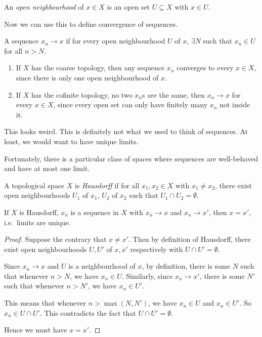 \documentclass[a4paper]{article}
\begin{document}
\begin{defi}
  An \emph{open neighbourhood} of $x\in X$ is an open set $U\subseteq X$ with $x\in U$.
\end{defi}

Now we can use this to define convergence of sequences.
\begin{defi}
  A sequence $x_n \to x$ if for every open neighbourhood $U$ of $x$, $\exists N$ such that $x_n \in U$ for all $n > N$.
\end{defi}

\begin{eg}\leavevmode
  \begin{enumerate}
    \item If $X$ has the coarse topology, then any sequence $x_n$ converges to every $x\in X$, since there is only one open neighbourhood of $x$.
    \item If $X$ has the cofinite topology, no two $x_n$s are the same, then $x_n \to x$ for every $x\in X$, since every open set can only have finitely many $x_n$ not inside it.
  \end{enumerate}
\end{eg}

This looks weird. This is definitely not what we used to think of sequences. At least, we would want to have unique limits.

Fortunately, there is a particular class of spaces where sequences are well-behaved and have at most one limit.
\begin{defi}
  A topological space $X$ is \emph{Hausdorff} if for all $x_1, x_2\in X$ with $x_1 \not= x_2$, there exist open neighbourhoods $U_1$ of $x_1$, $U_2$ of $x_2$ such that $U_1 \cap U_2 = \emptyset$.
\end{defi}

\begin{lemma}
  If $X$ is Hausdorff, $x_n$ is a sequence in $X$ with $x_n \to x$ and $x_n \to x'$, then $x = x'$, i.e.\ limits are unique.
\end{lemma}

\begin{proof}
  Suppose the contrary that $x\not= x'$. Then by definition of Hausdorff, there exist open neighbourhoods $U, U'$ of $x, x'$ respectively with $U \cap U' = \emptyset$.

  Since $x_n \to x$ and $U$ is a neighbourhood of $x$, by definition, there is some $N$ such that whenever $n > N$, we have $x_n \in U$. Similarly, since $x_n \to x'$, there is some $N'$ such that whenever $n > N'$, we have $x_n \in U'$.

  This means that whenever $n > \max(N, N')$, we have $x_n \in U$ and $x_n \in U'$. So $x_n \in U\cap U'$. This contradicts the fact that $U \cap U' = \emptyset$.

  Hence we must have $x = x'$.
\end{proof}
\end{document}
